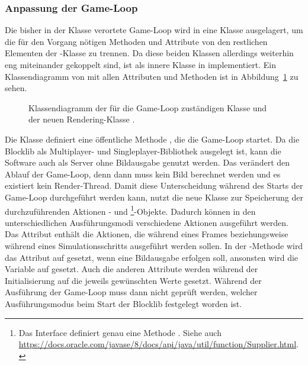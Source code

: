 \subsubsection{Anpassung der Game-Loop}\label{sec:adjustGameLoop}
Die bisher in der Klasse  verortete Game-Loop wird in eine Klasse  ausgelagert, um die für den Vorgang nötigen Methoden und Attribute von den restlichen Elementen der -Klasse zu trennen. Da diese beiden Klassen allerdings weiterhin eng miteinander gekoppelt sind, ist  als innere Klasse in  implementiert. Ein Klassendiagramm von   mit allen Attributen und Methoden ist in Abbildung~\ref{fig:DiagGameLoop} zu sehen.
\begin{figure}[htbp]
	\centering
	
	\caption[Klassendiagramm von  und .]{Klassendiagramm der für die Game-Loop zuständigen Klasse  und der neuen Rendering-Klasse .}\label{fig:DiagGameLoop}
\end{figure}
Die Klasse definiert eine öffentliche Methode , die die Game-Loop startet. Da die Blocklib als Multiplayer- und Singleplayer-Bibliothek ausgelegt ist, kann die Software auch als Server ohne Bildausgabe genutzt werden. Das verändert den Ablauf der Game-Loop, denn dann muss kein Bild berechnet werden und es existiert kein Render-Thread. Damit diese Unterscheidung während des Starts der Game-Loop durchgeführt werden kann, nutzt die neue Klasse  zur Speicherung der durchzuführenden Aktionen - und \footnote{Das Interface  definiert genau eine Methode . Siehe auch \url{https://docs.oracle.com/javase/8/docs/api/java/util/function/Supplier.html}.}-Objekte. Dadurch können in den unterschiedlichen Ausführungsmodi verschiedene Aktionen ausgeführt werden. Das Attribut  enthält die Aktionen, die während eines Frames beziehungsweise während eines Simulationsschritts ausgeführt werden sollen. In der -Methode wird das Attribut auf  gesetzt, wenn eine Bildausgabe erfolgen soll, ansonsten wird die Variable auf  gesetzt. Auch die anderen Attribute werden während der Initialisierung auf die jeweils gewünschten Werte gesetzt. Während der Ausführung der Game-Loop muss dann nicht geprüft werden, welcher Ausführungsmodus beim Start der Blocklib festgelegt worden ist.

